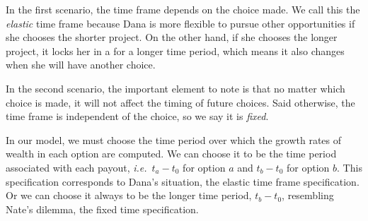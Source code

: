 \documentclass[11pt]{article}
\newcommand{\ie}{{\it i.e.}\ }
\newcommand{\Dt}{\Delta t}
\numberwithin{equation}{section}
\begin{document}
In the first scenario, the time frame depends on the choice made. We call this the \textit{elastic} time frame because Dana is more flexible to pursue other opportunities if she chooses the shorter project. On the other hand, if she chooses the longer project, it locks her in a for a longer time period, which means it also changes when she will have another choice.  

In the second scenario, the important element to note is that no matter which choice is made, it will not affect the timing of future choices. Said otherwise, the time frame is independent of the choice, so we say it is \textit{fixed}.

In our model, we must choose the time period over which the growth rates of wealth in each option are computed. We can choose it to be the time period associated with each payout, \ie $t_a-t_0$ for option $a$ and $t_b-t_0$ for option $b$. This specification corresponds to Dana's situation, the elastic time frame specification. Or we can choose it always to be the longer time period, $t_b-t_0$, resembling Nate's dilemma, the fixed time specification.




\end{document}
